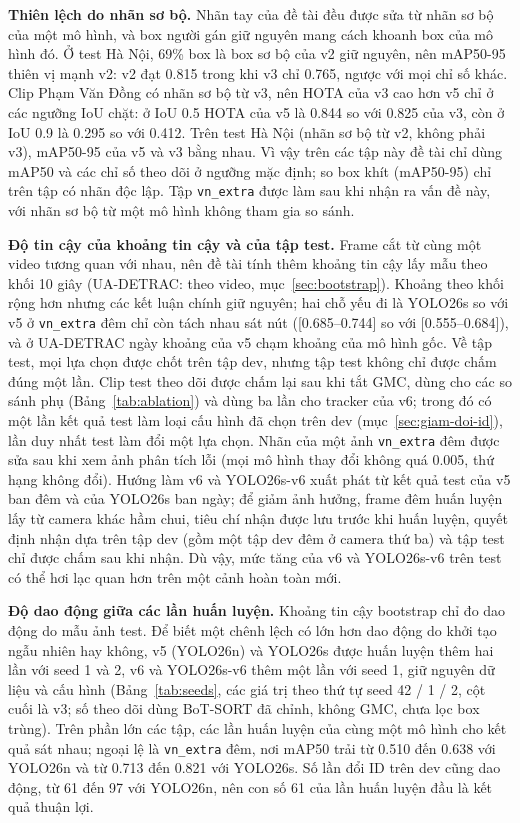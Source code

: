 \textbf{Thiên lệch do nhãn sơ bộ.} Nhãn tay của đề tài đều được sửa từ nhãn sơ bộ của một mô hình, và box người gán giữ
nguyên mang cách khoanh box của mô hình đó. Ở test Hà Nội, 69\% box là box sơ bộ của v2 giữ nguyên, nên mAP50-95 thiên vị
mạnh v2: v2 đạt 0.815 trong khi v3 chỉ 0.765, ngược với mọi chỉ số khác. Clip Phạm Văn Đồng có nhãn sơ bộ từ v3, nên
HOTA của v3 cao hơn v5 chỉ ở các ngưỡng IoU chặt: ở IoU 0.5 HOTA của v5 là 0.844 so với 0.825 của v3, còn ở IoU 0.9 là
0.295 so với 0.412. Trên test Hà Nội (nhãn sơ bộ từ v2, không phải v3), mAP50-95 của v5 và v3 bằng nhau. Vì vậy trên các
tập này đề tài chỉ dùng mAP50 và các chỉ số theo dõi ở ngưỡng mặc định; so box khít (mAP50-95) chỉ trên tập có nhãn độc
lập. Tập \texttt{vn\_extra} được làm sau khi nhận ra vấn đề này, với nhãn sơ bộ từ một mô hình không tham gia so sánh.

\textbf{Độ tin cậy của khoảng tin cậy và của tập test.} Frame cắt từ cùng một video tương quan với nhau, nên đề tài tính
thêm khoảng tin cậy lấy mẫu theo khối 10 giây (UA-DETRAC: theo video, mục~\ref{sec:bootstrap}). Khoảng theo khối rộng hơn
nhưng các kết luận chính giữ nguyên; hai chỗ yếu đi là YOLO26s so với v5 ở \texttt{vn\_extra} đêm chỉ còn tách nhau sát
nút ([0.685--0.744] so với [0.555--0.684]), và ở UA-DETRAC ngày khoảng của v5 chạm khoảng của mô hình gốc. Về tập test,
mọi lựa chọn được chốt trên tập dev, nhưng tập test không chỉ được chấm đúng một lần. Clip test theo dõi được chấm lại
sau khi tắt GMC, dùng cho các so sánh phụ (Bảng~\ref{tab:ablation}) và dùng ba lần cho tracker của v6; trong đó có một
lần kết quả test làm loại cấu hình đã chọn trên dev (mục~\ref{sec:giam-doi-id}), lần duy nhất test làm đổi một lựa chọn.
Nhãn của một ảnh \texttt{vn\_extra} đêm được sửa sau khi xem ảnh phân tích lỗi (mọi mô hình thay đổi không quá 0.005,
thứ hạng không đổi). Hướng làm v6 và YOLO26s-v6 xuất phát từ kết quả test của v5 ban đêm và của YOLO26s ban ngày; để
giảm ảnh hưởng, frame đêm huấn luyện lấy từ camera khác hầm chui, tiêu chí nhận được lưu trước khi huấn luyện, quyết
định nhận dựa trên tập dev (gồm một tập dev đêm ở camera thứ ba) và tập test chỉ được chấm sau khi nhận. Dù vậy, mức
tăng của v6 và YOLO26s-v6 trên test có thể hơi lạc quan hơn trên một cảnh hoàn toàn mới.

\textbf{Độ dao động giữa các lần huấn luyện.} Khoảng tin cậy bootstrap chỉ đo dao động do mẫu ảnh test. Để biết một
chênh lệch có lớn hơn dao động do khởi tạo ngẫu nhiên hay không, v5 (YOLO26n) và YOLO26s được huấn luyện thêm hai
lần với seed 1 và 2, v6 và YOLO26s-v6 thêm một lần với seed 1, giữ nguyên dữ liệu và cấu hình (Bảng~\ref{tab:seeds}, các giá trị theo thứ tự seed 42 / 1 / 2, cột cuối là v3;
số theo dõi dùng BoT-SORT đã chỉnh, không GMC, chưa lọc box trùng).
Trên phần lớn các tập, các lần huấn luyện của cùng một mô hình cho kết quả sát nhau; ngoại lệ là \texttt{vn\_extra} đêm,
nơi mAP50 trải từ 0.510 đến 0.638 với YOLO26n và từ 0.713 đến 0.821 với YOLO26s. Số lần đổi ID trên dev cũng dao động,
từ 61 đến 97 với YOLO26n, nên con số 61 của lần huấn luyện đầu là kết quả thuận lợi.

